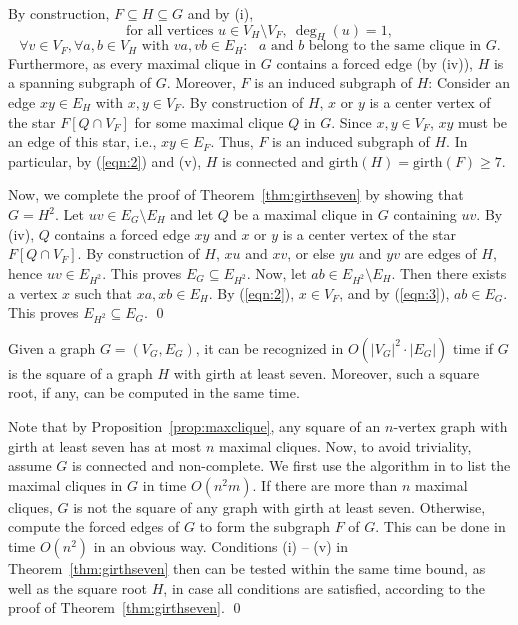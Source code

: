 \documentclass[proceedings]{stacs}
\newlength{\ai}
\begin{document}
By construction, $F\subseteq H\subseteq G$ and by (i),
\begin{equation}\label{eqn:2}
\text{for all vertices $u\in V_H\setminus V_F,~\deg_H(u)=1$},
\end{equation}
\begin{equation}\label{eqn:3}
\forall v\in V_F, \forall a, b \in V_H\text{ with }va, vb\in E_H: \text{ $a$ and $b$ belong to
the same clique in $G$}.
\end{equation}
Furthermore, as every maximal clique in $G$ contains a forced edge (by (iv)), $H$ is a spanning
subgraph of $G$. Moreover, $F$ is an induced subgraph of $H$: Consider an edge $xy\in E_H$ with
$x, y\in V_F$. By construction of $H$, $x$ or $y$ is a center vertex of the star $F[Q\cap V_F]$
for some maximal clique $Q$ in $G$. Since $x, y\in V_F$, $xy$ must be an edge of this star, i.e.,
$xy\in E_F$. Thus, $F$ is an induced subgraph of $H$. In particular, by (\ref{eqn:2}) and (v),
$H$ is connected and $\text{girth}(H)=\text{girth}(F)\ge 7$.

Now, we complete the proof of Theorem~\ref{thm:girthseven} by showing that $G=H^2$.
Let $uv\in E_G\setminus E_H$ and let $Q$ be a maximal clique in $G$ containing
$uv$. By (iv), $Q$ contains a forced edge $xy$ and $x$ or $y$ is a center vertex of the star
$F[Q\cap V_F]$. By construction of $H$, $xu$ and $xv$, or else $yu$ and $yv$ are edges of $H$,
hence $uv\in E_{H^2}$. This proves $E_G\subseteq E_{H^2}$.
Now, let $ab\in E_{H^2}\setminus E_H$. Then there exists a vertex $x$ such that
$xa, xb\in E_H$. By (\ref{eqn:2}), $x\in V_F$, and by (\ref{eqn:3}), $ab\in E_G$.
This proves $E_{H^2}\subseteq E_G$. \qed

\begin{corollary}\label{coro:girthseven}
Given a graph $G=(V_G, E_G)$, it can be recognized in $O(|V_G|^2\cdot |E_G|)$ time if $G$ is the
square of a graph $H$ with girth at least seven. Moreover, such a square root, if any, can be
computed in the same time.
\end{corollary}
\proof Note that by Proposition~\ref{prop:maxclique}, any square of an $n$-vertex graph with girth
at least seven has at most $n$ maximal cliques. Now, to avoid triviality, assume $G$ is connected
and non-complete. We first use the algorithm in \cite{TIAS} to list the maximal cliques in $G$ in
time $O(n^2m)$. If there are more than $n$ maximal cliques, $G$ is not the square of any graph
with girth at least seven. Otherwise, compute the forced edges of $G$ to form the subgraph $F$ of
$G$. This can be done in time $O(n^2)$ in an obvious way.
Conditions (i) -- (v) in Theorem~\ref{thm:girthseven} then can
be tested within the same time bound, as well as the square root $H$, in case all conditions are
satisfied, according to the proof of Theorem~\ref{thm:girthseven}. \qed
\end{document}
